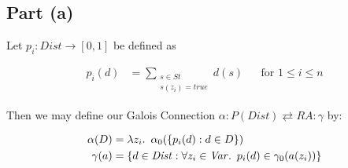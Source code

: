 \subsection{Part (a)}\label{sec:q-3-a}

Let $p_i : \mathit{Dist}\to[0,1]$ be defined as

\begin{align*}
  p_i(d) & = \sum_{\substack{s\in\mathit{St}\\s(z_i) = \mathit{true}}}d(s) && \text{for }1\leq i\leq n
\end{align*}

Then we may define our Galois Connection $\alpha : P(\mathit{Dist})\rightleftarrows \mathit{RA} : \gamma$ by:

\begin{align*}
  \alpha(D) & = \lambda z_i\ldotp~\alpha_0(\{p_i(d) : d\in D\}) \\
  \gamma(a) & = \{d\in\mathit{Dist}:\forall z_i\in\mathit{Var}\ldotp~p_i(d)\in\gamma_0(a(z_i))\}
\end{align*}

